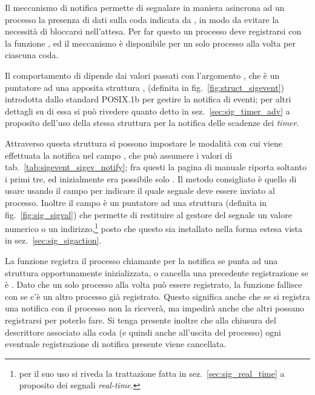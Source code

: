 Il meccanismo di notifica permette di segnalare in maniera asincrona ad un
processo la presenza di dati sulla coda indicata da , in modo da
evitare la necessità di bloccarsi nell'attesa. Per far questo un processo deve
registrarsi con la funzione , ed il meccanismo è disponibile
per un solo processo alla volta per ciascuna coda.

Il comportamento di  dipende dai valori passati con
l'argomento , che è un puntatore ad una apposita struttura
, (definita in fig.~\ref{fig:struct_sigevent}) introdotta
dallo standard POSIX.1b per gestire la notifica di eventi; per altri dettagli
su di essa si può rivedere quanto detto in sez.~\ref{sec:sig_timer_adv} a
proposito dell'uso della stessa struttura per la notifica delle scadenze dei
\textit{timer}.

Attraverso questa struttura si possono impostare le modalità con cui viene
effettuata la notifica nel campo , che può assumere i
valori di tab.~\ref{tab:sigevent_sigev_notify}; fra questi la pagina di
manuale riporta soltanto i primi tre, ed inizialmente era possibile solo
. Il metodo consigliato è quello di usare
 usando il campo  per indicare il quale
segnale deve essere inviato al processo. Inoltre il campo  è
un puntatore ad una struttura  (definita in
fig.~\ref{fig:sig_sigval}) che permette di restituire al gestore del segnale
un valore numerico o un indirizzo,\footnote{per il suo uso si riveda la
  trattazione fatta in sez.~\ref{sec:sig_real_time} a proposito dei segnali
  \textit{real-time}.} posto che questo sia installato nella forma estesa
vista in sez.~\ref{sec:sig_sigaction}.

La funzione registra il processo chiamante per la notifica se
 punta ad una struttura  opportunamente
inizializzata, o cancella una precedente registrazione se è . Dato
che un solo processo alla volta può essere registrato, la funzione fallisce
con  se c'è un altro processo già registrato. Questo significa
anche che se si registra una notifica con  il processo non
la riceverà, ma impedirà anche che altri possano registrarsi per poterlo fare.
Si tenga presente inoltre che alla chiusura del descrittore associato alla
coda (e quindi anche all'uscita del processo) ogni eventuale registrazione di
notifica presente viene cancellata.

